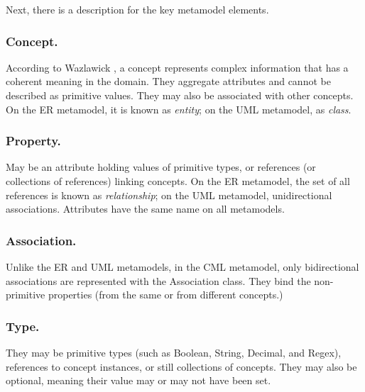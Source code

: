 Next, there is a description for the key metamodel elements.

\subsubsection{Concept.}

According to Wazlawick \cite{wazlawick},
a concept represents complex information that has a coherent meaning in the domain.
They aggregate attributes and cannot be described as primitive values.
They may also be associated with other concepts.
On the ER metamodel, it is known as \emph{entity};
on the UML metamodel, as \emph{class}.

\subsubsection{Property.}

May be an attribute holding values of primitive types,
or references (or collections of references) linking concepts.
On the ER metamodel,
the set of all references is known as \emph{relationship};
on the UML metamodel, unidirectional associations.
Attributes have the same name on all metamodels.

\subsubsection{Association.}

Unlike the ER and UML metamodels, in the CML metamodel, only bidirectional associations are represented with the Association class. They bind the non-primitive properties (from the same or from different concepts.) 


\subsubsection{Type.} They may be primitive types (such as Boolean, String, Decimal, and Regex), references to concept instances, or still collections of concepts. They may also be optional, meaning their value may or may not have been set.

